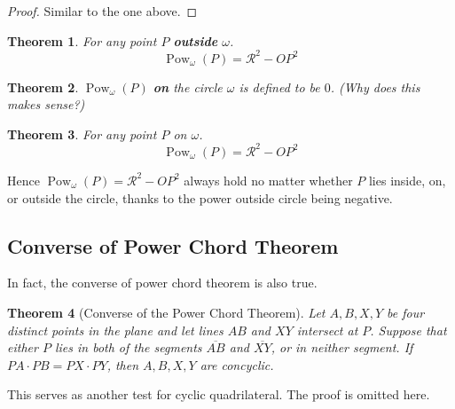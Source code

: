 \documentclass{article}
\DeclareMathOperator{\Pow}{Pow}
\newtheorem{theorem}{Theorem}
\theoremstyle{definition}
\begin{document}
\begin{proof}
	Similar to the one above.
\end{proof}

\begin{mdframed}
	\begin{theorem}
		For any point $P$ \textbf{outside} $\omega$.
		\begin{equation*}
			\Pow_\omega(P) = \mathcal{R}^2 - OP^2	
		\end{equation*}
	\end{theorem}
\end{mdframed}

\begin{mdframed}
	\begin{theorem}
		$\Pow_\omega(P)$ \textbf{on} the circle $\omega$ is defined to be $0$. (Why does this makes sense?)
	\end{theorem}
\end{mdframed}

\begin{mdframed}
	\begin{theorem}
		For any point $P$ on $\omega$.
		\begin{equation*}
			\Pow_\omega(P) = \mathcal{R}^2 - OP^2	
		\end{equation*}
	\end{theorem}
\end{mdframed}

Hence $\Pow_\omega(P) = \mathcal{R}^2 - OP^2$ always hold no matter whether $P$ lies inside, on, or outside the circle, thanks to the power outside circle being negative.

\subsection{Converse of Power Chord Theorem}

In fact, the converse of power chord theorem is also true.	
\begin{mdframed}
	\begin{theorem}[Converse of the Power Chord Theorem]
		Let $A,B,X,Y$ be four distinct points in the plane and let lines  $AB$ and  $XY$ intersect at $P$. Suppose that either $P$ lies in both of the segments $\overline{AB}$ and $\overline{XY}$, or in neither segment. If $PA \cdot PB = PX \cdot PY$, then $A, B, X, Y$ are concyclic.
	\end{theorem}
\end{mdframed}
This serves as another test for cyclic quadrilateral. The proof is omitted here.
\end{document}
